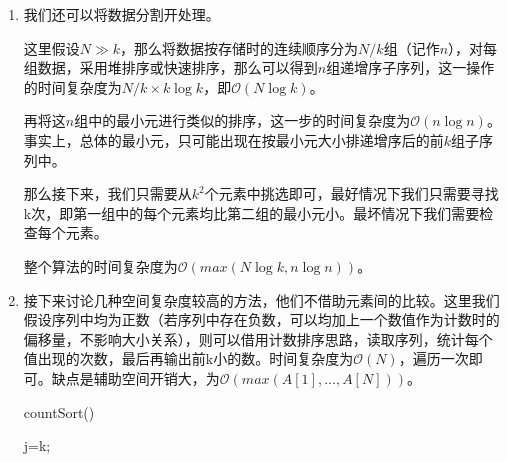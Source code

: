 \documentclass[12pt,a4paper]{article}
\theoremstyle{definition}
\begin{document}
\begin{enumerate}
\begin{center}
\begin{algorithm}[H]
		\end{algorithm}
	\end{center}
	
	
	\item 我们还可以将数据分割开处理。
	
	这里假设$N\gg k$，那么将数据按存储时的连续顺序分为$N/k$组（记作$n$），对每组数据，采用堆排序或快速排序，那么可以得到$n$组递增序子序列，这一操作的时间复杂度为$N/k\times k\log k$，即$\mathcal{O}(N\log k)$。
	
	再将这$n$组中的最小元进行类似的排序，这一步的时间复杂度为$\mathcal{O}(n\log n)$。事实上，总体的最小元，只可能出现在按最小元大小排递增序后的前$k$组子序列中。
	
	那么接下来，我们只需要从$k^2$个元素中挑选即可，最好情况下我们只需要寻找k次，即第一组中的每个元素均比第二组的最小元小。最坏情况下我们需要检查每个元素。
	
	整个算法的时间复杂度为$\mathcal{O}(max(N\log k,n\log n))$。
	
	\item 接下来讨论几种空间复杂度较高的方法，他们不借助元素间的比较。这里我们假设序列中均为正数（若序列中存在负数，可以均加上一个数值作为计数时的偏移量，不影响大小关系），则可以借用计数排序思路，读取序列，统计每个值出现的次数，最后再输出前k小的数。时间复杂度为$\mathcal{O}(N)$，遍历一次即可。缺点是辅助空间开销大，为$\mathcal{O}(max(A[1],\ldots,A[N]))$。
	\begin{center}
		\begin{algorithm}[H]
			\caption{countSort()}
			j=k;\\
		\end{algorithm}
	\end{center}
	



\end{enumerate}
\end{document}
